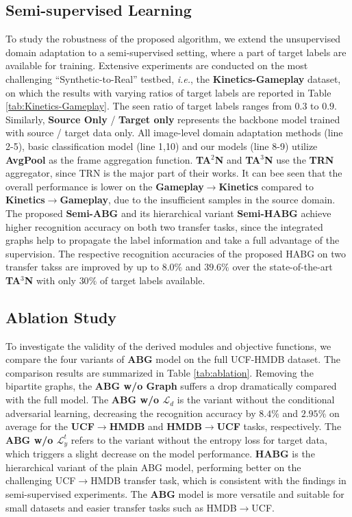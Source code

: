 \subsection{Semi-supervised Learning}
To study the robustness of the proposed algorithm, we extend the unsupervised domain adaptation to a semi-supervised setting, where a part of target labels are available for training. Extensive experiments are conducted on the most challenging ``Synthetic-to-Real'' testbed, \textit{i.e.}, the \textbf{Kinetics-Gameplay} dataset, on which the results with varying ratios of target labels are reported in Table \ref{tab:Kinetics-Gameplay}. The seen ratio of target labels ranges from $0.3$ to $0.9$. Similarly, \textbf{Source Only} / \textbf{Target only} represents the backbone model trained with source / target data only. All image-level domain adaptation methods (line 2-5), basic classification model (line 1,10) and our models (line 8-9) utilize \textbf{AvgPool} as the frame aggregation function. \textbf{TA$^2$N} and \textbf{TA$^3$N} use the \textbf{TRN} aggregator, since TRN is the major part of their works. It can bee seen that the overall performance is lower on the \textbf{Gameplay$\rightarrow$Kinetics} compared to \textbf{Kinetics$\rightarrow$Gameplay}, due to the insufficient samples in the source domain. The proposed \textbf{Semi-ABG} and its hierarchical variant \textbf{Semi-HABG} achieve higher recognition accuracy on both two transfer tasks, since the integrated graphs help to propagate the label information and take a full advantage of the supervision. The respective recognition accuracies of the proposed HABG on two transfer takss are improved by up to $8.0\%$ and $39.6\%$ over the state-of-the-art \textbf{TA$^3$N} with only $30\%$ of target labels available.


\vspace{-0.3cm}
\subsection{Ablation Study}
To investigate the validity of the derived modules and objective functions, we compare the four variants of \textbf{ABG} model on the full UCF-HMDB dataset. The comparison results are summarized in Table \ref{tab:ablation}. Removing the bipartite graphs, the \textbf{ABG w/o Graph} suffers a drop dramatically compared with the full model. The \textbf{ABG w/o $\mathcal{L}_d$} is the variant without the conditional adversarial learning, decreasing the recognition accuracy by $8.4\%$ and $2.95\%$ on average for the \textbf{UCF$\rightarrow$HMDB} and\textbf{ HMDB$\rightarrow$UCF} tasks, respectively. The \textbf{ABG w/o $\mathcal{L}_y^t$} refers to the variant without the entropy loss for target data, which triggers a slight decrease on the model performance. \textbf{HABG} is the hierarchical variant of the plain ABG model, performing better on the challenging UCF$\rightarrow$HMDB transfer task, which is consistent with the findings in semi-supervised experiments. The \textbf{ABG} model is more versatile and suitable for small datasets and easier transfer tasks such as HMDB$\rightarrow$UCF.


